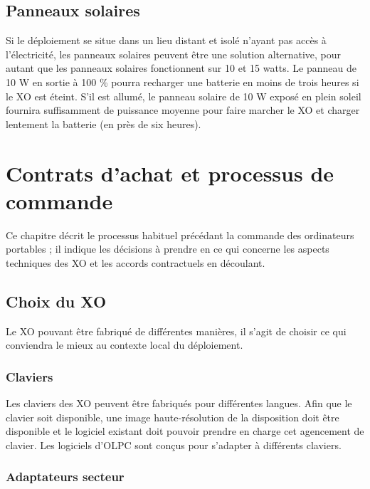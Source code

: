 \documentclass[11pt]{article}
\begin{document}
\subsection{Panneaux solaires}
\label{sec-7-1}


Si le déploiement se situe dans un lieu distant et isolé n'ayant pas accès
à l'électricité, les panneaux solaires peuvent être une solution
alternative, pour autant que les panneaux solaires fonctionnent sur 10 et
15 watts. Le panneau de 10 W en sortie à 100 \% pourra recharger une
batterie en moins de trois heures si le XO est éteint. S'il est allumé, le
panneau solaire de 10 W exposé en plein soleil fournira suffisamment de
puissance moyenne pour faire marcher le XO et charger lentement la batterie
(en près de six heures).
\section{Contrats d'achat et processus de commande}
\label{sec-8}


Ce chapitre décrit le processus habituel précédant la commande des
ordinateurs portables ; il indique les décisions à prendre en ce qui
concerne les aspects techniques des XO et les accords contractuels en
découlant.
\subsection{Choix du XO}
\label{sec-8-1}



Le XO pouvant être fabriqué de différentes manières, il s'agit de choisir
ce qui conviendra le mieux au contexte local du déploiement.
\subsubsection{Claviers}
\label{sec-8-1-1}



Les claviers des XO peuvent être fabriqués pour différentes langues. Afin
que le clavier soit disponible, une image haute-résolution de la
disposition doit être disponible et le logiciel existant doit pouvoir
prendre en charge cet agencement de clavier. Les logiciels d'OLPC sont
conçus pour s'adapter à différents claviers.
\subsubsection{Adaptateurs secteur}
\label{sec-8-1-2}


\end{document}
